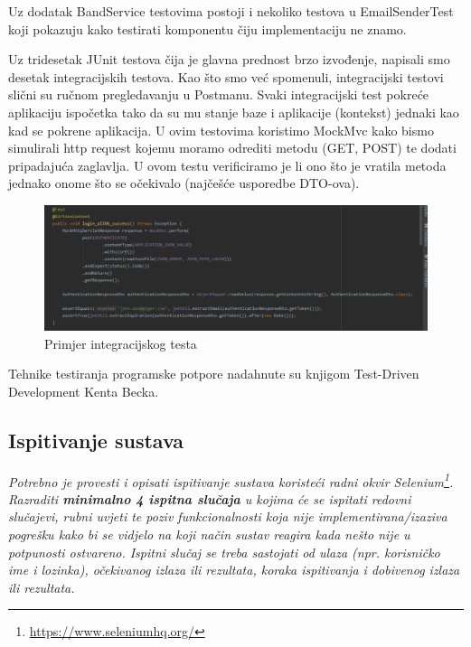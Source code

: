 			Uz dodatak BandService testovima postoji i nekoliko testova u EmailSenderTest koji pokazuju kako testirati komponentu čiju implementaciju ne znamo.
			
			
			Uz tridesetak JUnit testova čija je glavna prednost brzo izvođenje, napisali smo desetak integracijskih testova. Kao što smo već spomenuli, integracijski testovi slični su ručnom pregledavanju u Postmanu. Svaki integracijski test pokreće aplikaciju ispočetka tako da su mu stanje baze i aplikacije (kontekst) jednaki kao kad se pokrene aplikacija. U ovim testovima koristimo MockMvc kako bismo simulirali http request kojemu moramo odrediti metodu (GET, POST) te dodati pripadajuća zaglavlja. U ovom testu verificiramo je li ono što je vratila metoda jednako onome što se očekivalo (najčešće usporedbe DTO-ova).
			
			\begin{figure}[H]
				\begin{center}
					\includegraphics[width=17cm]{slike/integracijski_test.PNG}
				\end{center}
				\caption{Primjer integracijskog testa}
				\label{fig:inttest}
			\end{figure}
			
			Tehnike testiranja programske potpore nadahnute su knjigom Test-Driven Development Kenta Becka.
			
			
			
			\subsection{Ispitivanje sustava}
			
			 \textit{Potrebno je provesti i opisati ispitivanje sustava koristeći radni okvir Selenium\footnote{\url{https://www.seleniumhq.org/}}. Razraditi \textbf{minimalno 4 ispitna slučaja} u kojima će se ispitati redovni slučajevi, rubni uvjeti te poziv funkcionalnosti koja nije implementirana/izaziva pogrešku kako bi se vidjelo na koji način sustav reagira kada nešto nije u potpunosti ostvareno. Ispitni slučaj se treba sastojati od ulaza (npr. korisničko ime i lozinka), očekivanog izlaza ili rezultata, koraka ispitivanja i dobivenog izlaza ili rezultata.\\ }
			 

